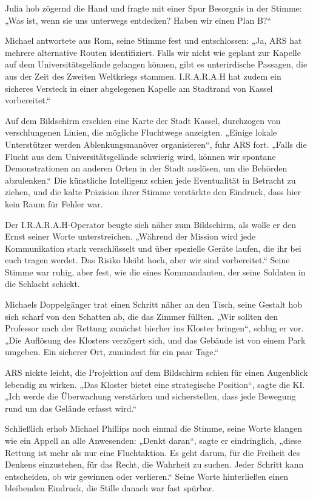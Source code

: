 \documentclass[
]{article}
\begin{document}
Julia hob zögernd die Hand und fragte mit einer Spur Besorgnis in der
Stimme: „Was ist, wenn sie uns unterwegs entdecken? Haben wir einen Plan
B?{\kern0pt}``

Michael antwortete aus Rom, seine Stimme fest und entschlossen: „Ja, ARS
hat mehrere alternative Routen identifiziert. Falls wir nicht wie
geplant zur Kapelle auf dem Universitätsgelände gelangen können, gibt es
unterirdische Passagen, die aus der Zeit des Zweiten Weltkriegs stammen.
I.R.A.R.A.H hat zudem ein sicheres Versteck in einer abgelegenen Kapelle
am Stadtrand von Kassel vorbereitet.``

Auf dem Bildschirm erschien eine Karte der Stadt Kassel, durchzogen von
verschlungenen Linien, die mögliche Fluchtwege anzeigten. „Einige lokale
Unterstützer werden Ablenkungsmanöver organisieren``, fuhr ARS fort.
„Falls die Flucht aus dem Universitätsgelände schwierig wird, können wir
spontane Demonstrationen an anderen Orten in der Stadt auslösen, um die
Behörden abzulenken.`` Die künstliche Intelligenz schien jede
Eventualität in Betracht zu ziehen, und die kalte Präzision ihrer Stimme
verstärkte den Eindruck, dass hier kein Raum für Fehler war.

Der I.R.A.R.A.H-Operator beugte sich näher zum Bildschirm, als wolle er
den Ernst seiner Worte unterstreichen. „Während der Mission wird jede
Kommunikation stark verschlüsselt und über spezielle Geräte laufen, die
ihr bei euch tragen werdet. Das Risiko bleibt hoch, aber wir sind
vorbereitet.`` Seine Stimme war ruhig, aber fest, wie die eines
Kommandanten, der seine Soldaten in die Schlacht schickt.

Michaels Doppelgänger trat einen Schritt näher an den Tisch, seine
Gestalt hob sich scharf von den Schatten ab, die das Zimmer füllten.
„Wir sollten den Professor nach der Rettung zunächst hierher ins Kloster
bringen``, schlug er vor. „Die Auflösung des Klosters verzögert sich,
und das Gebäude ist von einem Park umgeben. Ein sicherer Ort, zumindest
für ein paar Tage.``

ARS nickte leicht, die Projektion auf dem Bildschirm schien für einen
Augenblick lebendig zu wirken. „Das Kloster bietet eine strategische
Position``, sagte die KI. „Ich werde die Überwachung verstärken und
sicherstellen, dass jede Bewegung rund um das Gelände erfasst wird.``

Schließlich erhob Michael Phillips noch einmal die Stimme, seine Worte
klangen wie ein Appell an alle Anwesenden: „Denkt daran``, sagte er
eindringlich, „diese Rettung ist mehr als nur eine Fluchtaktion. Es geht
darum, für die Freiheit des Denkens einzustehen, für das Recht, die
Wahrheit zu suchen. Jeder Schritt kann entscheiden, ob wir gewinnen oder
verlieren.`` Seine Worte hinterließen einen bleibenden Eindruck, die
Stille danach war fast spürbar.
\end{document}
